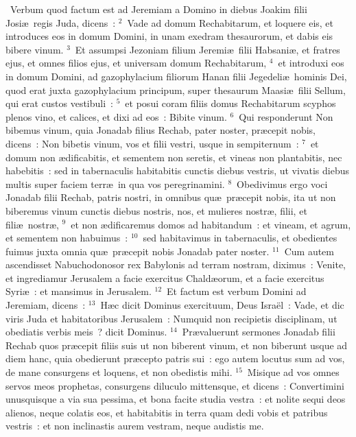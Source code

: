 ~Verbum quod factum est ad Jeremiam a Domino in diebus Joakim filii Josi\ae\ regis Juda, dicens~:
${}^{2}$~Vade ad domum Rechabitarum, et loquere eis, et introduces eos in domum Domini, in unam exedram thesaurorum, et dabis eis bibere vinum.
${}^{3}$~Et assumpsi Jezoniam filium Jeremi\ae\ filii Habsani\ae , et fratres ejus, et omnes filios ejus, et universam domum Rechabitarum,
${}^{4}$~et introduxi eos in domum Domini, ad gazophylacium filiorum Hanan filii Jegedeli\ae\ hominis Dei, quod erat juxta gazophylacium principum, super thesaurum Maasi\ae\ filii Sellum, qui erat custos vestibuli~:
${}^{5}$~et posui coram filiis domus Rechabitarum scyphos plenos vino, et calices, et dixi ad eos~: Bibite vinum.
${}^{6}$~Qui responderunt Non bibemus vinum, quia Jonadab filius Rechab, pater noster, pr\ae cepit nobis, dicens~: Non bibetis vinum, vos et filii vestri, usque in sempiternum~:
${}^{7}$~et domum non \ae dificabitis, et sementem non seretis, et vineas non plantabitis, nec habebitis~: sed in tabernaculis habitabitis cunctis diebus vestris, ut vivatis diebus multis super faciem terr\ae\ in qua vos peregrinamini.
${}^{8}$~Obedivimus ergo voci Jonadab filii Rechab, patris nostri, in omnibus qu\ae\ pr\ae cepit nobis, ita ut non biberemus vinum cunctis diebus nostris, nos, et mulieres nostr\ae , filii, et fili\ae\ nostr\ae ,
${}^{9}$~et non \ae dificaremus domos ad habitandum~: et vineam, et agrum, et sementem non habuimus~:
${}^{10}$~sed habitavimus in tabernaculis, et obedientes fuimus juxta omnia qu\ae\ pr\ae cepit nobis Jonadab pater noster.
${}^{11}$~Cum autem ascendisset Nabuchodonosor rex Babylonis ad terram nostram, diximus~: Venite, et ingrediamur Jerusalem a facie exercitus Chald\ae orum, et a facie exercitus Syri\ae~: et mansimus in Jerusalem.
${}^{12}$~Et factum est verbum Domini ad Jeremiam, dicens~:
${}^{13}$~H\ae c dicit Dominus exercituum, Deus Isra\"el~: Vade, et dic viris Juda et habitatoribus Jerusalem~: Numquid non recipietis disciplinam, ut obediatis verbis meis~? dicit Dominus.
${}^{14}$~Pr\ae valuerunt sermones Jonadab filii Rechab quos pr\ae cepit filiis suis ut non biberent vinum, et non biberunt usque ad diem hanc, quia obedierunt pr\ae cepto patris sui~: ego autem locutus sum ad vos, de mane consurgens et loquens, et non obedistis mihi.
${}^{15}$~Misique ad vos omnes servos meos prophetas, consurgens diluculo mittensque, et dicens~: Convertimini unusquisque a via sua pessima, et bona facite studia vestra~: et nolite sequi deos alienos, neque colatis eos, et habitabitis in terra quam dedi vobis et patribus vestris~: et non inclinastis aurem vestram, neque audistis me.
